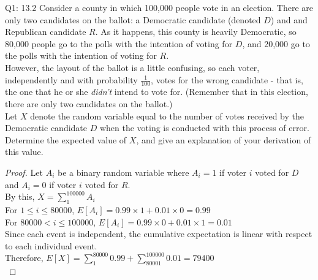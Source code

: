 \begin{problem}
    {Q1: 13.2}
    Consider a county in which 100,000 people vote in an election.
    There are only two candidates on the ballot: a Democratic candidate (denoted $D$) and
    and Republican candidate $R$. As it happens, this county is heavily Democratic, so 80,000
    people go to the polls with the intention of voting for $D$, and 20,000 go to the polls with the intention of voting for $R$.\\

    However, the layout of the ballot is a little confusing, so each voter, independently and with probability $\frac{1}{100}$, votes for the
    wrong candidate - that is, the one that he or she \textit{didn't} intend to vote for.
    (Remember that in this election, there are only two candidates on the ballot.)\\

    Let $X$ denote the random variable equal to the number of votes received by the Democratic candidate $D$ when the voting is conducted with this
    process of error. Determine the expected value of $X$, and give an explanation of your derivation of this value.

    \begin{proof}
        Let $A_i$ be a binary random variable where $A_i = 1$ if voter $i$ voted for $D$ and $A_i = 0$ if voter $i$ voted for $R$. \\
        By this, $X = \sum_{1}^{100000} A_i$ \\
        For $1 \leq i \leq 80000$, $E[A_i] = 0.99 \times 1 + 0.01 \times 0 = 0.99$ \\
        For $80000 < i \leq 100000$, $E[A_i] = 0.99 \times 0 + 0.01 \times 1 = 0.01$ \\
        Since each event is independent, the cumulative expectation is linear with respect to each individual event. \\
        Therefore, $E[X] = \sum_{1}^{80000} 0.99 + \sum_{80001}^{100000} 0.01 = 79400$ \\
    \end{proof}
\end{problem}
